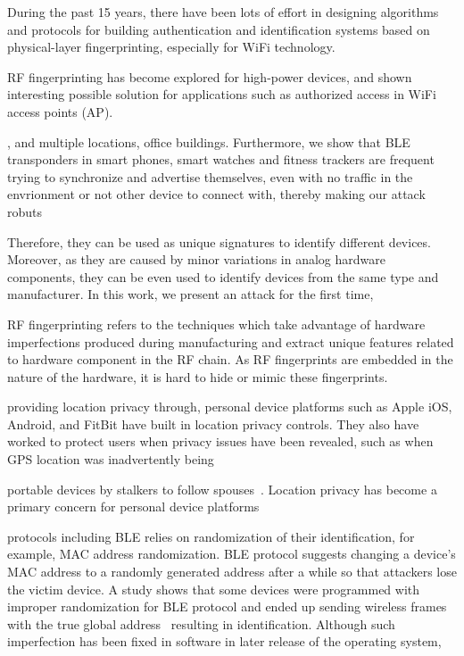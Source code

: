 During the past 15 years, there have been lots of
effort in designing algorithms and protocols for building authentication and
identification systems based on physical-layer fingerprinting, especially for
WiFi technology.

RF fingerprinting has become explored for high-power devices, and shown
interesting possible solution for applications such as authorized access in
WiFi access points (AP).

, and multiple
locations, office buildings. Furthermore, we show that BLE transponders in
smart phones, smart watches and fitness trackers are frequent trying to
synchronize and advertise themselves, even with no traffic in the envrionment
or not other device to connect with, thereby making our attack robuts

Therefore, they can be used as unique signatures
to identify different devices.  Moreover, as they are caused by minor
variations in analog hardware components, they can be  even used to identify
devices from the same type and manufacturer.  In this work, we present an
attack for the first time, 

RF fingerprinting refers to the techniques which take advantage of hardware
imperfections produced during manufacturing and extract unique features related
to hardware component in the RF chain. As RF fingerprints are embedded in the
nature of the hardware, it is hard to hide or mimic these fingerprints. 



providing location
privacy through, personal device platforms such as Apple iOS, Android, and
FitBit have built in location privacy controls.  They also have worked to
protect users when privacy issues have been revealed, such as when GPS location
was inadvertently being 



portable devices by stalkers to
follow spouses~\cite{ipv}.  Location privacy has become a primary concern for
personal device platforms



protocols including BLE relies
on randomization of their identification, for example, MAC address
randomization. BLE protocol suggests changing a device's MAC address to a
randomly generated address after a while so that attackers lose the victim
device. A study shows that some devices were programmed with improper
randomization for BLE protocol and ended up sending wireless frames with the
true global address~\cite{MACRandomizationfail_Martin} resulting in
identification. Although such imperfection has been fixed in software in later
release of the operating system,

